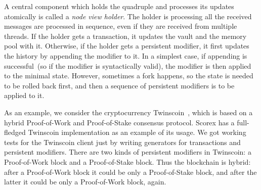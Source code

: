 A central component which holds the quadruple {\em <history, minimal state, vault, memory pool>} and processes its updates atomically is called a {\em node view holder}. The holder is processing all the received messages are processed in sequence, even if they are received from multiple threads. If the holder gets a transaction, it updates the vault and the memory pool with it. Otherwise, if the holder gets a persistent modifier, it first updates the history by appending the modifier to it. In a simplest case, if appending is successful~(so if the modifier is syntactically valid), the modifier is then applied to the minimal state. However, sometimes a fork happens, so the state is needed to be rolled back first, and then a sequence of persistent modifiers is to be applied to it. 

As an example, we consider the cryptocurrency Twinscoin~\cite{cryptoeprint:2017:232}, which is based on a hybrid Proof-of-Work and Proof-of-Stake consensus protocol. Scorex has a full-fledged Twinscoin implementation as an example of its usage. We got working tests for the Twinscoin client just by writing generators for transactions and persistent modifiers. There are two kinds of persistent modifiers in Twinscoin: a Proof-of-Work block and a Proof-of-Stake block. Thus the blockchain is hybrid: after a Proof-of-Work block it could be only a Proof-of-Stake block, and after the latter it could be only a Proof-of-Work block, again.   

